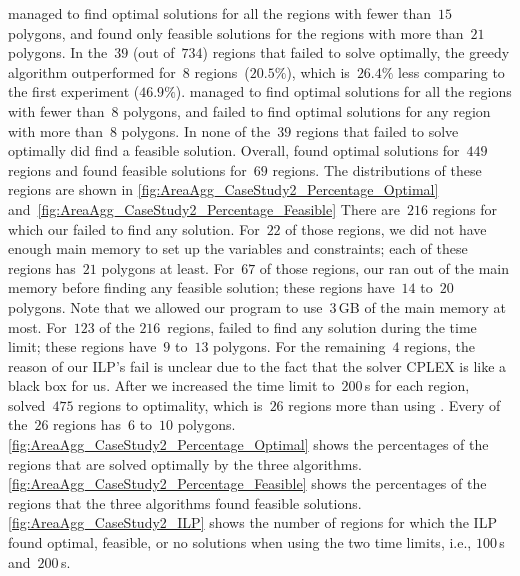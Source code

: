 \documentclass[acmsmall,natbib=false]{acmart}
\begin{document}
\Astar managed to find optimal solutions 
for all the regions with fewer than~$15$ polygons, and 
found only feasible solutions for the regions 
with more than~$21$ polygons.
%
In the~$39$ (out of~$734$) regions 
that \Astar failed to solve optimally,
the greedy algorithm outperformed \Astar 
for~$8$ regions~($20.5\%$), 
which is~$26.4\%$ less comparing to the first experiment ($46.9\%$).
%
\ILPOne managed to find optimal solutions 
for all the regions with fewer than~$8$ polygons,
and failed to find optimal solutions
for any region with more than~$8$ polygons.
In none of the~$39$ regions 
that \Astar failed to solve optimally
did \ILPOne find a feasible solution.
Overall, \ILPOne 
found optimal solutions for~$449$ regions
and found feasible solutions for~$69$ regions.
The distributions of these regions are shown in
\figs\ref{fig:AreaAgg_CaseStudy2_Percentage_Optimal}
and~\fig\ref{fig:AreaAgg_CaseStudy2_Percentage_Feasible}
There are~$216$ regions for which 
our \ILPOne failed to find any solution.
For~$22$ of those regions, 
we did not have enough main memory 
to set up the variables and constraints;
each of these regions has~$21$ polygons at least.
For~$67$ of those regions, 
our \ILPOne ran out of the main memory 
before finding any feasible solution;
these regions have~$14$ to~$20$ polygons.
Note that we allowed our program to use~$3\,$GB 
of the main memory at most.
For~$123$ of the $216$~regions, 
\ILPOne failed to find any solution
during the time limit;
these regions have~$9$ to~$13$ polygons.
For the remaining~$4$ regions, 
the reason of our ILP's fail is unclear 
due to the fact that 
the solver CPLEX is like a black box for us.
After we increased the time limit to~$200\,$s for each region, 
\ILPTwo solved~$475$ regions to optimality, which 
is~$26$ regions more than using \ILPOne.
Every of the~$26$ regions has~$6$ to~$10$ polygons.
\fig\ref{fig:AreaAgg_CaseStudy2_Percentage_Optimal}
shows the percentages of the regions 
that are solved optimally by the three algorithms.
\fig\ref{fig:AreaAgg_CaseStudy2_Percentage_Feasible} 
shows the percentages of the regions 
that the three algorithms found feasible solutions.
\fig\ref{fig:AreaAgg_CaseStudy2_ILP} shows 
the number of regions for which 
the ILP found optimal, feasible, or no solutions 
when using the two time limits, i.e., $100\,$s and~$200\,$s.
\end{document}
